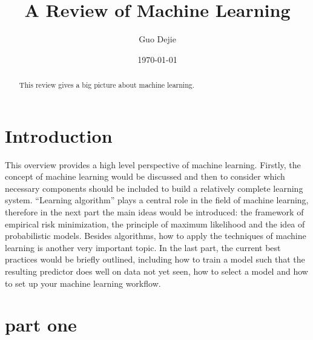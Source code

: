 \documentclass[
]{extarticle}
\title{A Review of Machine Learning}
\author{Guo Dejie}
\date{\today{}}
\begin{document}
\maketitle
\begin{abstract}
This review gives a big picture about machine learning.
\end{abstract}

\hypertarget{introduction}{%
\section{Introduction}\label{introduction}}

This overview provides a high level perspective of machine learning.
Firstly, the concept of machine learning would be discussed and then to
consider which necessary components should be included to build a
relatively complete learning system. ``Learning algorithm'' plays a
central role in the field of machine learning, therefore in the next
part the main ideas would be introduced: the framework of empirical risk
minimization, the principle of maximum likelihood and the idea of
probabilistic models. Besides algorithms, how to apply the techniques of
machine learning is another very important topic. In the last part, the
current best practices would be briefly outlined, including how to train
a model such that the resulting predictor does well on data not yet
seen, how to select a model and how to set up your machine learning
workflow.

\hypertarget{part-one}{%
\section{part one}\label{part-one}}
\end{document}
